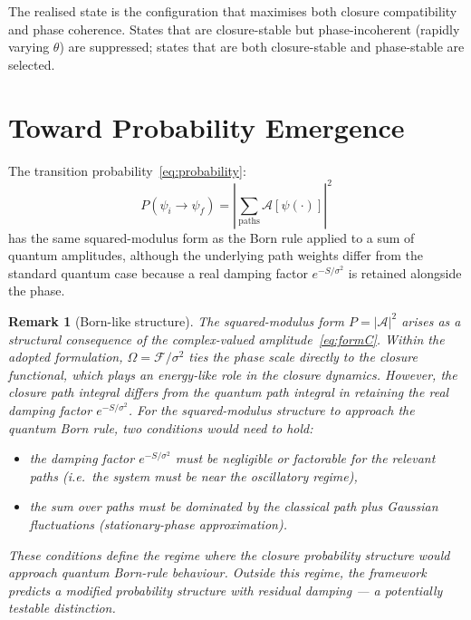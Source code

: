 \documentclass[12pt]{article}
\newtheorem{remark}[theorem]{Remark}
\newcommand{\Fcal}{\mathcal{F}}
\begin{document}
The realised state is the configuration that maximises both closure compatibility and phase coherence. States that are closure-stable but phase-incoherent (rapidly varying $\theta$) are suppressed; states that are both closure-stable and phase-stable are selected.

\section{Toward Probability Emergence}\label{sec:probability}

The transition probability~\eqref{eq:probability}:
\begin{equation}
    P(\psi_i \to \psi_f) = \left|\sum_{\text{paths}} \mathcal{A}[\psi(\cdot)]\right|^2
\end{equation}
has the same squared-modulus form as the Born rule applied to a sum of quantum amplitudes, although the underlying path weights differ from the standard quantum case because a real damping factor $e^{-S/\sigma^2}$ is retained alongside the phase.

\begin{remark}[Born-like structure]
The squared-modulus form $P = |\mathcal{A}|^2$ arises as a structural consequence of the complex-valued amplitude~\eqref{eq:formC}. Within the adopted formulation, $\Omega = \Fcal/\sigma^2$ ties the phase scale directly to the closure functional, which plays an energy-like role in the closure dynamics. However, the closure path integral differs from the quantum path integral in retaining the real damping factor $e^{-S/\sigma^2}$. For the squared-modulus structure to approach the quantum Born rule, two conditions would need to hold:
\begin{itemize}
    \item the damping factor $e^{-S/\sigma^2}$ must be negligible or factorable for the relevant paths (i.e.\ the system must be near the oscillatory regime),
    \item the sum over paths must be dominated by the classical path plus Gaussian fluctuations (stationary-phase approximation).
\end{itemize}
These conditions define the regime where the closure probability structure would approach quantum Born-rule behaviour. Outside this regime, the framework predicts a modified probability structure with residual damping --- a potentially testable distinction.
\end{remark}
\end{document}
